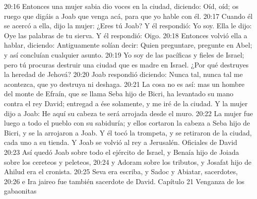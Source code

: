 20:16 Entonces una mujer sabia dio voces en la ciudad, diciendo: Oíd, oíd; os ruego que digáis a Joab que venga acá, para que yo hable con él.  
20:17 Cuando él se acercó a ella, dijo la mujer: ¿Eres tú Joab? Y él respondió: Yo soy. Ella le dijo: Oye las palabras de tu sierva. Y él respondió: Oigo.  
20:18 Entonces volvió ella a hablar, diciendo: Antiguamente solían decir: Quien preguntare, pregunte en Abel; y así concluían cualquier asunto.  
20:19 Yo soy de las pacíficas y fieles de Israel; pero tú procuras destruir una ciudad que es madre en Israel. ¿Por qué destruyes la heredad de Jehová?  
20:20 Joab respondió diciendo: Nunca tal, nunca tal me acontezca, que yo destruya ni deshaga.  
20:21 La cosa no es así: mas un hombre del monte de Efraín, que se llama Seba hijo de Bicri, ha levantado su mano contra el rey David; entregad a ése solamente, y me iré de la ciudad. Y la mujer dijo a Joab: He aquí su cabeza te será arrojada desde el muro.  
20:22 La mujer fue luego a todo el pueblo con su sabiduría; y ellos cortaron la cabeza a Seba hijo de Bicri, y se la arrojaron a Joab. Y él tocó la trompeta, y se retiraron de la ciudad, cada uno a su tienda. Y Joab se volvió al rey a Jerusalén.  
Oficiales de David   
20:23 Así quedó Joab sobre todo el ejército de Israel, y Benaía hijo de Joiada sobre los cereteos y peleteos,  
20:24 y Adoram sobre los tributos, y Josafat hijo de Ahilud era el cronista.  
20:25 Seva era escriba, y Sadoc y Abiatar, sacerdotes,  
20:26 e Ira jaireo fue también sacerdote de David.  
Capítulo 21
Venganza de los gabaonitas  

